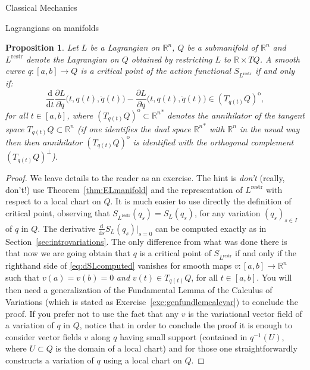 \documentclass[oneside,a4paper,11pt]{amsbook}
\newcommand{\R}{\mathds R}
\newcommand{\dd}{\mathrm d}
\newcommand{\anul}{\mathrm o}
\theoremstyle{remark}\newtheorem{exercise}{Exercise}[chapter]
\theoremstyle{plain}\newtheorem{teo}{Theorem}[section]
\theoremstyle{plain}\newtheorem{lem}[teo]{Lemma}
\theoremstyle{plain}\newtheorem{prop}[teo]{Proposition}
\theoremstyle{plain}\newtheorem{cor}[teo]{Corollary}
\theoremstyle{definition}\newtheorem{defin}[teo]{Definition}
\theoremstyle{remark}\newtheorem{rem}[teo]{Remark}
\theoremstyle{definition}\newtheorem{notation}[teo]{Notation}
\theoremstyle{definition}\newtheorem{convention}[teo]{Convention}
\theoremstyle{definition}\newtheorem{example}[teo]{Example}
\numberwithin{section}{chapter}
\numberwithin{equation}{section}
\begin{document}
\begin{chapter}{Classical Mechanics}
\begin{section}{Lagrangians on manifolds}
\begin{prop}\label{thm:propLagrestr}
Let $L$ be a Lagrangian on $\R^n$, $Q$ be a submanifold of $\R^n$ and $L^{\mathrm{restr}}$ denote the Lagrangian
on $Q$ obtained by restricting $L$ to $\R\times TQ$. A smooth curve $q:[a,b]\to Q$ is a critical point of
the action functional $S_{L^{\mathrm{restr}}}$ if and only if:
\[\frac{\dd}{\dd t}\frac{\partial L}{\partial\dot q}\big(t,q(t),\dot q(t)\big)-
\frac{\partial L}{\partial q}\big(t,q(t),\dot q(t)\big)\in(T_{q(t)}Q)^\anul,\]
for all $t\in[a,b]$, where $(T_{q(t)}Q)^\anul\subset{\R^n}^*$ denotes the annihilator of the tangent
space $T_{q(t)}Q\subset\R^n$ (if one identifies the dual space ${\R^n}^*$ with $\R^n$ in the usual way then
then annihilator $(T_{q(t)}Q)^\anul$ is identified with the orthogonal complement $(T_{q(t)}Q)^\perp$).
\end{prop}
\begin{proof}
We leave details to the reader as an exercise. The hint is {\em don't\/} (really, don't!) use
Theorem~\ref{thm:ELmanifold} and the representation of $L^{\mathrm{restr}}$ with respect to a local chart on $Q$.
It is much easier to use directly the definition of critical point, observing that
$S_{L^{\mathrm{restr}}}(q_s)=S_L(q_s)$, for any variation $(q_s)_{s\in I}$ of $q$ in $Q$. The derivative
$\frac{\dd}{\dd s}S_L(q_s)\vert_{s=0}$ can be computed exactly as in Section~\ref{sec:introvariations}. The only
difference from what was done there is that now we are going obtain that $q$ is a critical point of $S_{L^{\mathrm{restr}}}$
if and only if the righthand side of \eqref{eq:dSLcomputed} vanishes for smooth maps $v:[a,b]\to\R^n$ such that
$v(a)=v(b)=0$ {\em and\/} $v(t)\in T_{q(t)}Q$, for all $t\in[a,b]$. You will then need a generalization of
the Fundamental Lemma of the Calculus of Variations (which is stated as Exercise~\ref{exe:genfundlemcalcvar})
to conclude the proof. If you prefer not to use the fact that any $v$ is the variational vector field of a variation
of $q$ in $Q$, notice that
in order to conclude the proof it is enough to consider vector fields $v$ along $q$ having small support
(contained in $q^{-1}(U)$, where $U\subset Q$ is the domain of a local chart) and
for those one straightforwardly constructs a variation of $q$ using a local chart on $Q$.
\end{proof}


\end{section}
\end{chapter}
\end{document}
